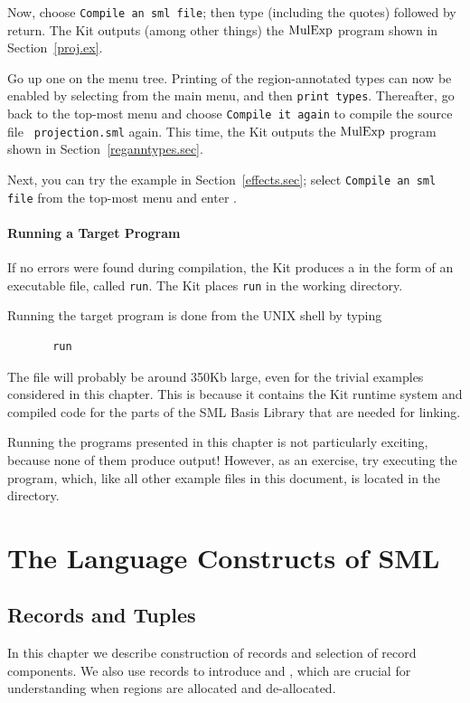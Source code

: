 \documentclass[12pt]{book}
\begin{document}
Now, choose \texttt{Compile an sml file}; then type
 (including the quotes) followed by return.
The Kit outputs (among other things) the $\hbox{\rm MulExp}$ program shown in
Section~\ref{proj.ex}.

Go up one on the menu tree.  Printing of the region-annotated types
can now be enabled by selecting  from the main menu, and
then \texttt{print types}.  Thereafter, go back to the top-most menu
and choose \texttt{Compile it again} to compile the source file {\tt
  projection.sml} again. This time, the Kit outputs the $\hbox{\rm MulExp}$
program shown in Section~\ref{reganntypes.sec}.

Next, you can try the example in Section~\ref{effects.sec}; select
\texttt{Compile an sml file} from the top-most menu and enter
.


\subsection{Running a Target Program}
If no errors were found during compilation, the Kit produces a
 in the form of an
executable file, called {\tt run}. The Kit places {\tt run} in the
working directory.

Running the target program is done from the UNIX shell by typing 
\begin{verbatim}
       run
\end{verbatim}
The file will probably be around 350Kb large, even for the trivial
examples considered in this chapter.  This is because it contains the
Kit runtime system and compiled code for the parts of the SML Basis
Library that are needed for linking.

Running the programs presented in this chapter is not particularly
exciting, because none of them produce output! However, as an
exercise, try executing the  program, which, like all other example files in this
document, is located in the  directory.


\part{The Language Constructs of SML}
\label{understanding.sec}
\chapter{Records and Tuples}
\label{records.sec}
In this chapter we describe construction of records and selection of record
components. We also use records to introduce   and , which are crucial for understanding when regions are allocated
and de-allocated.
\end{document}
